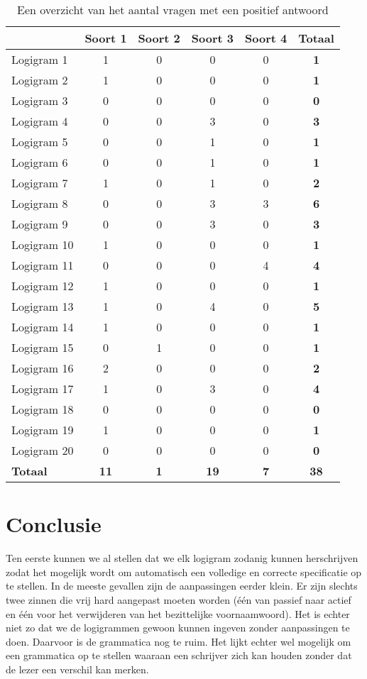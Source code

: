 \begin{table}[]
  \centering
  \begin{tabular}{lccccc}
  \toprule
              & \textbf{Soort 1} & \textbf{Soort 2} & \textbf{Soort 3} & \textbf{Soort 4} & \textbf{Totaal} \\
  \hline
  Logigram 1  & 1 & 0 & 0 & 0 & \textbf{1} \\
  Logigram 2  & 1 & 0 & 0 & 0 & \textbf{1} \\
  Logigram 3  & 0 & 0 & 0 & 0 & \textbf{0} \\
  Logigram 4  & 0 & 0 & 3 & 0 & \textbf{3} \\
  Logigram 5  & 0 & 0 & 1 & 0 & \textbf{1} \\
  Logigram 6  & 0 & 0 & 1 & 0 & \textbf{1} \\
  Logigram 7  & 1 & 0 & 1 & 0 & \textbf{2} \\
  Logigram 8  & 0 & 0 & 3 & 3 & \textbf{6} \\
  Logigram 9  & 0 & 0 & 3 & 0 & \textbf{3} \\
  Logigram 10 & 1 & 0 & 0 & 0 & \textbf{1} \\
  Logigram 11 & 0 & 0 & 0 & 4 & \textbf{4} \\
  Logigram 12 & 1 & 0 & 0 & 0 & \textbf{1} \\
  Logigram 13 & 1 & 0 & 4 & 0 & \textbf{5} \\
  Logigram 14 & 1 & 0 & 0 & 0 & \textbf{1} \\
  Logigram 15 & 0 & 1 & 0 & 0 & \textbf{1} \\
  Logigram 16 & 2 & 0 & 0 & 0 & \textbf{2} \\
  Logigram 17 & 1 & 0 & 3 & 0 & \textbf{4} \\
  Logigram 18 & 0 & 0 & 0 & 0 & \textbf{0} \\
  Logigram 19 & 1 & 0 & 0 & 0 & \textbf{1} \\
  Logigram 20 & 0 & 0 & 0 & 0 & \textbf{0} \\
  \hline
  \textbf{Totaal} & \textbf{11} & \textbf{1} & \textbf{19} & \textbf{7} & \textbf{38} \\
    \bottomrule
  \end{tabular}
  \caption{Een overzicht van het aantal vragen met een positief antwoord}
  \label{tbl:vragen}
\end{table}

\section{Conclusie}
Ten eerste kunnen we al stellen dat we elk logigram zodanig kunnen herschrijven zodat het mogelijk wordt om automatisch een volledige en correcte specificatie op te stellen. In de meeste gevallen zijn de aanpassingen eerder klein. Er zijn slechts twee zinnen die vrij hard aangepast moeten worden (één van passief naar actief en één voor het verwijderen van het bezittelijke voornaamwoord). Het is echter niet zo dat we de logigrammen gewoon kunnen ingeven zonder aanpassingen te doen. Daarvoor is de grammatica nog te ruim. Het lijkt echter wel mogelijk om een grammatica op te stellen waaraan een schrijver zich kan houden zonder dat de lezer een verschil kan merken.

